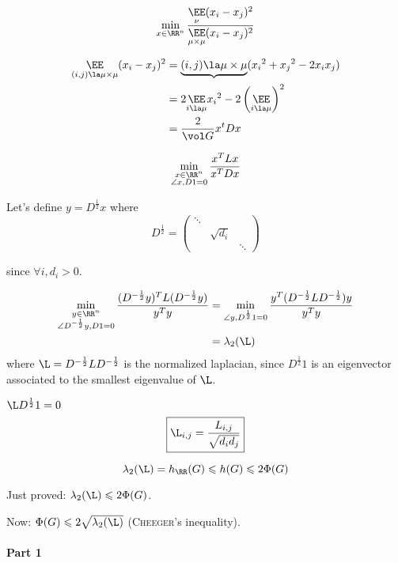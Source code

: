 \documentclass[12pt]{article}
\begin{document}
\[
    \min\limits_{x\in\RR^n} \frac{\underset{\nu}{\EE}(x_i-x_j)^2}{\underset{\mu\times\mu}{\EE}(x_i-x_j)^2}
\]


\[
    \begin{aligned}
        \underset{(i,j) \la \mu\times\mu}{\EE} (x_i-x_j)^2 &= \underbrace{(i,j)\la\mu\times\mu} ({x_i}^2+{x_j}^2-2x_ix_j)\\
        &= 2\underset{i\la \mu}{\EE} {x_i}^2 - 2\left( \underset{i\la \mu}{\EE}\right)^2\\
        &= \frac{2}{\vol G} x^t D x
    \end{aligned}
\]

\[
    \min\limits_{\substack{x\in\RR^n\\\angle{x,D1}=0}} \frac{x^TLx}{x^TDx}
\]


Let's define $y = D^{\frac{1}{2}} x$ where 
\[
    D^{\frac{1}{2}} = \left(\begin{matrix}
         \ddots \\
         & \sqrt{d_i}\\
         &&\ddots
    \end{matrix}\right)
\]

since $\forall i, d_i >0$.

\[
    \begin{aligned}
        \min\limits_{\substack{y\in\RR^n\\\angle{D^{- \frac{1}{2}}y,D1}=0}} \frac{(D^{-\frac{1}{2}} y)^T L (D^{-\frac{1}{2}}y)}{y^Ty} &= \min\limits_{\angle{y, D^{\frac{1}{2}}1}=0} \frac{y^T(D^{-\frac{1}{2}}LD^{-\frac{1}{2}})y}{y^T y}\\
        &= \lambda_2 (\L)
    \end{aligned}
\]
where $\L = D^{-\frac{1}{2}} L D^{-\frac{1}{2}}$ is the normalized laplacian, since $D^{\frac{1}{2}}1$ is an eigenvector associated to the smallest eigenvalue of $\L$.

$\L D^{\frac{1}{2}} 1 =0$
\[
    \boxed{\L_{i,j} = \frac{L_{i,j}}{\sqrt{d_id_j}}}
\]

\[
    \lambda_2(\L) = h_\RR(G) \leqslant h(G) \leqslant 2\Phi(G)
\]

Just proved: $\lambda_2(\L) \leqslant 2\Phi(G)$.

Now: $\Phi(G) \leqslant 2\sqrt{\lambda_2(\L)}$ (\textsc{Cheeger}'s inequality).

\paragraph{Part 1}
\end{document}
